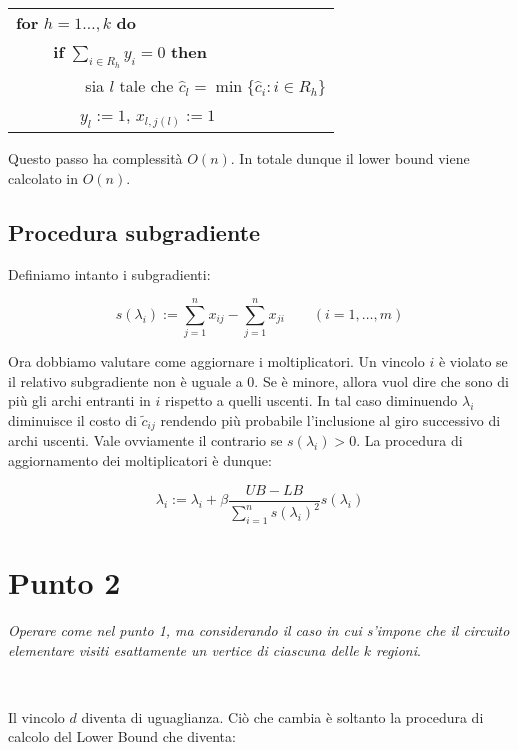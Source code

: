 \documentclass[11pt]{book}
\begin{document}
\vspace{15pt}
\begin{tabular}{l}
\textbf{for} $h=1\dots,k$ \textbf{do}\\
$\qquad$ \textbf{if} $\sum\limits_{i \in R_h}y_i =0$ \textbf{then}\\
$\qquad\qquad$ sia $l$ tale che $\hat{c}_l = \min\{ \hat{c}_i  : i\in
R_h\}$\\
$\qquad\qquad y_l :=1$, $x_{l,j(l)}:=1$
\end{tabular}
\vspace{15pt}

Questo passo ha complessit\`a $O(n)$. In totale dunque il lower bound
viene calcolato in $O(n)$.

\subsection*{Procedura subgradiente}

Definiamo intanto i subgradienti:

$$
s(\lambda_i) := \sum\limits_{j=1}^n x_{ij} - \sum\limits_{j=1}^n
x_{ji} \qquad (i=1,\dots,m)
$$

Ora dobbiamo valutare come aggiornare i moltiplicatori. Un vincolo $i$
\`e violato se il relativo subgradiente non \`e uguale a 0. Se \`e
minore, allora vuol dire che sono di pi\`u gli archi entranti in $i$
rispetto a quelli uscenti. In tal caso diminuendo $\lambda_i$
diminuisce il costo di $\tilde{c}_{ij}$ rendendo pi\`u probabile
l'inclusione al giro successivo di archi uscenti. Vale ovviamente il
contrario se $s(\lambda_i) > 0$. La procedura di aggiornamento dei
moltiplicatori \`e dunque:

$$
\lambda_i := \lambda_i + \beta \frac{UB-LB}{\sum\limits_{i=1}^n
  s(\lambda_i)^2} s(\lambda_i)
$$

\section*{Punto 2}

\textit{Operare come nel punto 1, ma considerando il caso in cui
  s'impone che il circuito elementare visiti esattamente un vertice di
  ciascuna delle $k$ regioni}.

\

Il vincolo $d$ diventa di uguaglianza. Ci\`o che cambia \`e soltanto
la procedura di calcolo del Lower Bound che diventa:
\end{document}
